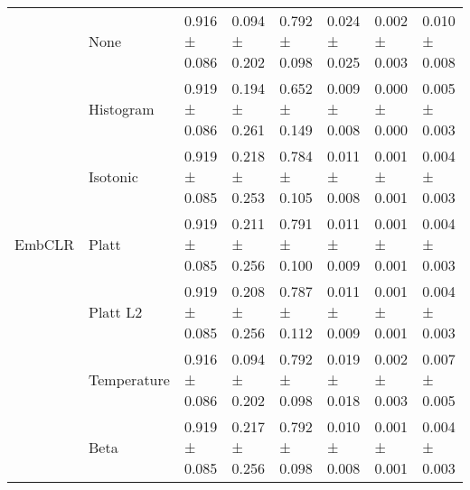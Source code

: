 \begin{tabular}{llllllll}
\cline{1-8}
\multirow[t]{7}{*}{EmbCLR} & None & 0.916 ± 0.086 & 0.094 ± 0.202 & 0.792 ± 0.098 & 0.024 ± 0.025 & 0.002 ± 0.003 & 0.010 ± 0.008 \\
 & Histogram & 0.919 ± 0.086 & 0.194 ± 0.261 & 0.652 ± 0.149 & 0.009 ± 0.008 & 0.000 ± 0.000 & 0.005 ± 0.003 \\
 & Isotonic & 0.919 ± 0.085 & 0.218 ± 0.253 & 0.784 ± 0.105 & 0.011 ± 0.008 & 0.001 ± 0.001 & 0.004 ± 0.003 \\
 & Platt & 0.919 ± 0.085 & 0.211 ± 0.256 & 0.791 ± 0.100 & 0.011 ± 0.009 & 0.001 ± 0.001 & 0.004 ± 0.003 \\
 & Platt L2 & 0.919 ± 0.085 & 0.208 ± 0.256 & 0.787 ± 0.112 & 0.011 ± 0.009 & 0.001 ± 0.001 & 0.004 ± 0.003 \\
 & Temperature & 0.916 ± 0.086 & 0.094 ± 0.202 & 0.792 ± 0.098 & 0.019 ± 0.018 & 0.002 ± 0.003 & 0.007 ± 0.005 \\
 & Beta & 0.919 ± 0.085 & 0.217 ± 0.256 & 0.792 ± 0.098 & 0.010 ± 0.008 & 0.001 ± 0.001 & 0.004 ± 0.003 \\
\cline{1-8}
\bottomrule
\end{tabular}
